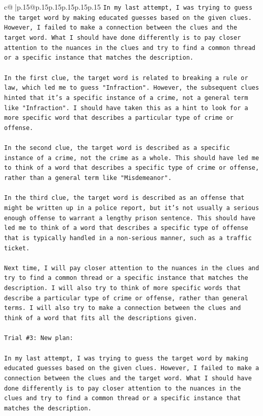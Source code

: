 \documentclass{article}
\begin{document}
{\begin{supertabular}{c@{$\;$}|p{.15\linewidth}@{}p{.15\linewidth}p{.15\linewidth}p{.15\linewidth}p{.15\linewidth}p{.15\linewidth}}
{{{\texttt{In my last attempt, I was trying to guess the target word by making educated guesses based on the given clues. However, I failed to make a connection between the clues and the target word. What I should have done differently is to pay closer attention to the nuances in the clues and try to find a common thread or a specific instance that matches the description.} \\
\\ 
\texttt{In the first clue, the target word is related to breaking a rule or law, which led me to guess "Infraction". However, the subsequent clues hinted that it's a specific instance of a crime, not a general term like "Infraction". I should have taken this as a hint to look for a more specific word that describes a particular type of crime or offense.} \\
\\ 
\texttt{In the second clue, the target word is described as a specific instance of a crime, not the crime as a whole. This should have led me to think of a word that describes a specific type of crime or offense, rather than a general term like "Misdemeanor".} \\
\\ 
\texttt{In the third clue, the target word is described as an offense that might be written up in a police report, but it's not usually a serious enough offense to warrant a lengthy prison sentence. This should have led me to think of a word that describes a specific type of offense that is typically handled in a non{-}serious manner, such as a traffic ticket.} \\
\\ 
\texttt{Next time, I will pay closer attention to the nuances in the clues and try to find a common thread or a specific instance that matches the description. I will also try to think of more specific words that describe a particular type of crime or offense, rather than general terms. I will also try to make a connection between the clues and think of a word that fits all the descriptions given.} \\
\\ 
\texttt{Trial \#3: New plan: } \\
\\ 
\texttt{In my last attempt, I was trying to guess the target word by making educated guesses based on the given clues. However, I failed to make a connection between the clues and the target word. What I should have done differently is to pay closer attention to the nuances in the clues and try to find a common thread or a specific instance that matches the description.} \\
}}}
\end{supertabular}}
\end{document}
